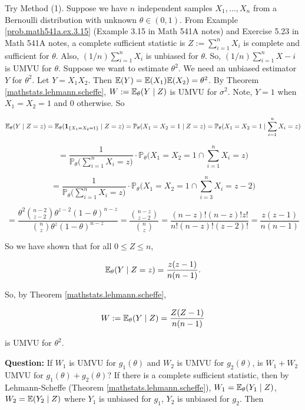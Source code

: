 \begin{example}Try Method (1). Suppose we have \(n\) independent samples \(X_1, \ldots, X_n\) from a Bernoulli distribution with unknown \(\theta \in (0,1)\). From Example \ref{prob.math541a.ex.3.15} (Example 3.15 in Math 541A notes) and Exercise 5.23 in Math 541A notes, a complete sufficient statistic is \(Z := \sum_{i=1}^n X_i\) is complete and sufficient for \(\theta\). Also, \((1/n) \sum_{i=1}^n X_i\) is unbiased for \(\theta\). So, \((1/n) \sum_{i=1}^n X-i\) is UMVU for \(\theta\). Suppose we want to estimate \(\theta^2\). We need an unbiased estimator \(Y\) for \(\theta^2\). Let \(Y = X_1 X_2\). Then \(\E(Y) = \E(X_1) \E(X_2) = \theta^2\). By Theorem \ref{mathstats.lehmann.scheffe}, \(W:= \E_\theta(Y \mid Z)\) is UMVU for \(\sigma^2\). Note, \(Y=1\) when \(X_1 = X_2 =1\) and 0 otherwise. So

\[
\E_\theta(Y \mid Z= z) = \E_\theta(\boldsymbol{1}_{\{X_1 = X_2 = 1\}} \mid Z= z)= \mathbb{P}_\theta (X_1 = X_2 = 1 \mid Z =z ) = \mathbb{P}_\theta(X_1 = X_2 = 1 \mid \sum_{i=1}^n X_i = z)
\]

\[
= \frac{1}{\mathbb{P}_\theta \bigg( \sum_{i=1}^n X_i = z\bigg) } \cdot \mathbb{P}_\theta \bigg(X_1 = X_2 = 1 \cap \sum_{i=1}^n X_i = z \bigg) 
\]

\[
= \frac{1}{\mathbb{P}_\theta \bigg( \sum_{i=1}^n X_i = z\bigg) } \cdot \mathbb{P}_\theta \bigg(X_1 = X_2 = 1 \cap \sum_{i=3}^n X_i = z - 2 \bigg) 
\]

\[
= \frac{\theta^2 \binom{n-2}{z-2} \theta^{z-2} (1 - \theta)^{n-z}}{\binom{n}{z}  \theta^z (1 - \theta)^{n-z}} = \frac{ \binom{n-z}{z-2}  }{ \binom{n}{z}   } = \frac{(n-z)!(n-z)! z!}{n!(n-z)!(z-2)!} = \frac{z(z-1)}{n(n-1)}
\]

So we have shown that for all \(0 \leq Z \leq n\), 

\[
\E_\theta(Y \mid Z =z) = \frac{z(z-1)}{n(n-1)}.
\]

So, by Theorem \ref{mathstats.lehmann.scheffe},

\[
W := \E_\theta(Y \mid Z) = \frac{Z(Z-1)}{n(n-1)} 
\]

is UMVU for \(\theta^2\).

\end{example}

\textbf{Question:} If \(W_1\) is UMVU for \(g_1(\theta)\) and \(W_2\) is UMVU for \(g_2(\theta)\), is \(W_1 + W_2\) UMVU for \(g_1(\theta) + g_2(\theta)\)? If there is a complete sufficient statistic, then by Lehmann-Scheffe (Theorem \ref{mathstats.lehmann.scheffe}), \(W_1 = \E_\theta(Y_1 \mid Z)\), \(W_2 = \E(Y _2 \mid Z)\) where \(Y_1\) is unbiased for \(g_1\), \(Y_2\) is unbiased for \(g_2\). Then

